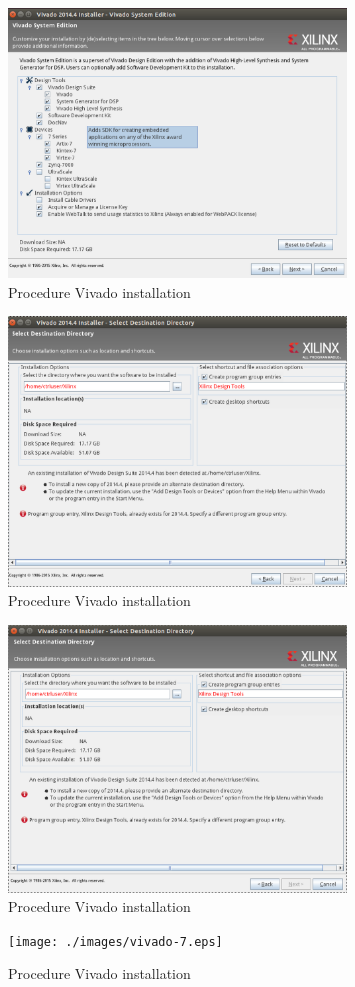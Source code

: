 \documentclass[11pt
  , a4paper
  , article
  , oneside
]{memoir}
\begin{document}
\begin{figure}[h!]
	\centering
	\includegraphics[width=0.8\textwidth, height=0.4\textwidth]{./images/vivado-4.eps}
	\caption{Procedure Vivado installation}
	\label{fig:viva_install_4} 
\end{figure}	

\begin{figure}[h!]
	\centering
	\includegraphics[width=0.8\textwidth, height=0.4\textwidth]{./images/vivado-5.eps}
	\caption{Procedure Vivado installation}
	\label{fig:viva_install_5} 
\end{figure}	

\begin{figure}[h!]
	\centering
	\includegraphics[width=0.8\textwidth, height=0.4\textwidth]{./images/vivado-6.eps}
	\caption{Procedure Vivado installation}
	\label{fig:viva_install_6} 
\end{figure}	

\begin{figure}[h!]
	\centering
	\texttt{[image: ./images/vivado-7.eps]}
	\caption{Procedure Vivado installation}
	\label{fig:viva_install_7} 
\end{figure}
\end{document}

